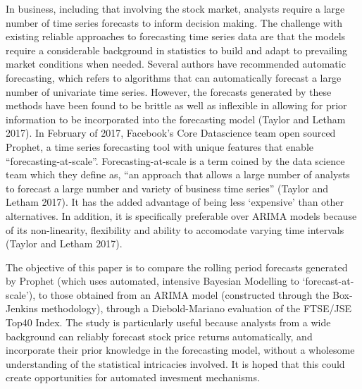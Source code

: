 \documentclass[12pt,a4paper]{article}
\numberwithin{equation}{section}
\numberwithin{figure}{section}
\numberwithin{table}{section}
\begin{document}
In business, including that involving the stock market, analysts require
a large number of time series forecasts to inform decision making. The
challenge with existing reliable approaches to forecasting time series
data are that the models require a considerable background in statistics
to build and adapt to prevailing market conditions when needed. Several
authors have recommended automatic forecasting, which refers to
algorithms that can automatically forecast a large number of univariate
time series. However, the forecasts generated by these methods have been
found to be brittle as well as inflexible in allowing for prior
information to be incorporated into the forecasting model (Taylor and
Letham 2017). In February of 2017, Facebook's Core Datascience team open
sourced Prophet, a time series forecasting tool with unique features
that enable ``forecasting-at-scale''. Forecasting-at-scale is a term
coined by the data science team which they define as, ``an approach that
allows a large number of analysts to forecast a large number and variety
of business time series'' (Taylor and Letham 2017). It has the added
advantage of being less `expensive' than other alternatives. In
addition, it is specifically preferable over ARIMA models because of its
non-linearity, flexibility and ability to accomodate varying time
intervals (Taylor and Letham 2017).

The objective of this paper is to compare the rolling period forecasts
generated by Prophet (which uses automated, intensive Bayesian Modelling
to `forecast-at-scale'), to those obtained from an ARIMA model
(constructed through the Box-Jenkins methodology), through a
Diebold-Mariano evaluation of the FTSE/JSE Top40 Index. The study is
particularly useful because analysts from a wide background can reliably
forecast stock price returns automatically, and incorporate their prior
knowledge in the forecasting model, without a wholesome understanding of
the statistical intricacies involved. It is hoped that this could create
opportunities for automated invesment mechanisms.
\end{document}
